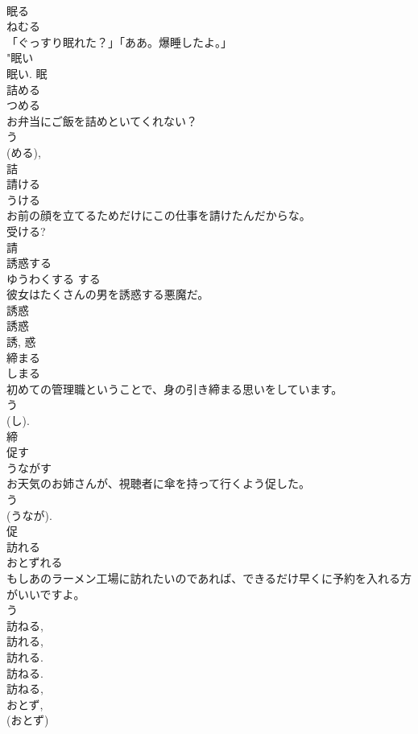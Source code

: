 \documentclass[8pt]{extreport}
\begin{document}
\begin{CJK}{UTF8}{min}
\\	眠る	
\\	ねむる	
\\	「ぐっすり眠れた？」「ああ。爆睡したよ。」	
\\	"眠い 
\\	眠い.	眠	
\\	詰める	
\\	つめる	
\\	お弁当にご飯を詰めといてくれない？	
\\	う 
\\	(める), 
\\	詰	
\\	請ける	
\\	うける	
\\	お前の顔を立てるためだけにこの仕事を請けたんだからな。	
\\	受ける? 
\\	請	
\\	誘惑する	
\\	ゆうわくする	する 
\\	彼女はたくさんの男を誘惑する悪魔だ。	
\\	誘惑 
\\	誘惑 
\\	誘, 惑	
\\	締まる	
\\	しまる	
\\	初めての管理職ということで、身の引き締まる思いをしています。	
\\	う 
\\	(し). 
\\	締	
\\	促す	
\\	うながす	
\\	お天気のお姉さんが、視聴者に傘を持って行くよう促した。	
\\	う 
\\	(うなが). 
\\	促	
\\	訪れる	
\\	おとずれる	
\\	もしあのラーメン工場に訪れたいのであれば、できるだけ早くに予約を入れる方がいいですよ。	
\\	う 
\\	訪ねる, 
\\	訪れる, 
\\	訪れる. 
\\	訪ねる. 
\\	訪ねる, 
\\	おとず, 
\\	(おとず) 

\end{CJK}
\end{document}
